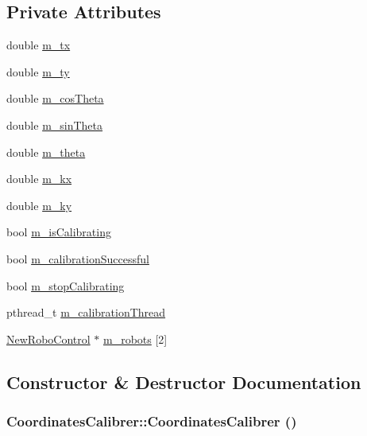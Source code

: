 \subsection*{Private Attributes}
\begin{DoxyCompactItemize}
\item 
double \hyperlink{classCoordinatesCalibrer_ad3dcf12acb15253d8467440ccf917581}{m\_\-tx}
\item 
double \hyperlink{classCoordinatesCalibrer_a7e9c56017cf2f279564f2aba38aa146b}{m\_\-ty}
\item 
double \hyperlink{classCoordinatesCalibrer_a0fd71c87e90fc61802942e22c9584fb9}{m\_\-cosTheta}
\item 
double \hyperlink{classCoordinatesCalibrer_af2675b7f9f8612eb53e81a5268501180}{m\_\-sinTheta}
\item 
double \hyperlink{classCoordinatesCalibrer_a039975d1cf826afcb960e77f8f957f91}{m\_\-theta}
\item 
double \hyperlink{classCoordinatesCalibrer_a337af708f5dc1bfca0d191b988d8ab49}{m\_\-kx}
\item 
double \hyperlink{classCoordinatesCalibrer_a10648b2ef70a9ad0fd874e04f3b4d488}{m\_\-ky}
\item 
bool \hyperlink{classCoordinatesCalibrer_a2d3543afab02c87d0e06861d064bd265}{m\_\-isCalibrating}
\item 
bool \hyperlink{classCoordinatesCalibrer_aade3d6c933ebb71c197061828ca6b951}{m\_\-calibrationSuccessful}
\item 
bool \hyperlink{classCoordinatesCalibrer_ac8da80d736936d73e78f21a7f046855d}{m\_\-stopCalibrating}
\item 
pthread\_\-t \hyperlink{classCoordinatesCalibrer_aa2b792c4284dc94338c9acbd26ea2c3a}{m\_\-calibrationThread}
\item 
\hyperlink{classNewRoboControl}{NewRoboControl} $\ast$ \hyperlink{classCoordinatesCalibrer_aebcdb5e598d2af268ab93a0271c245b6}{m\_\-robots} \mbox{[}2\mbox{]}
\end{DoxyCompactItemize}


\subsection{Constructor \& Destructor Documentation}
\hypertarget{classCoordinatesCalibrer_ac9a522299ada8f2e58ed8f0c91f4f396}{
\subsubsection[{CoordinatesCalibrer}]{\setlength{\rightskip}{0pt plus 5cm}CoordinatesCalibrer::CoordinatesCalibrer ()}}
\label{classCoordinatesCalibrer_ac9a522299ada8f2e58ed8f0c91f4f396}


